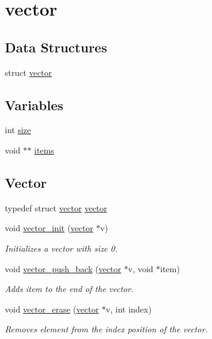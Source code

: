 \hypertarget{group__vector}{}\section{vector}
\label{group__vector}
\subsection*{Data Structures}
\begin{DoxyCompactItemize}
\item 
struct \hyperlink{structvector}{vector}
\end{DoxyCompactItemize}
\subsection*{Variables}
\begin{DoxyCompactItemize}
\item 
int \hyperlink{group__vector_ga439227feff9d7f55384e8780cfc2eb82}{size}
\item 
void $\ast$$\ast$ \hyperlink{group__vector_ga94977134c19c2c536550e6b13d69218d}{items}
\end{DoxyCompactItemize}
\subsection*{Vector}
\begin{DoxyCompactItemize}
\item 
typedef struct \hyperlink{structvector}{vector} \hyperlink{group__vector_ga604ea30e5e116f443a85a821a53402c7}{vector}
\item 
void \hyperlink{group__vector_ga2ca876aefcda7c65704d5a5b4e334eea}{vector\+\_\+init} (\hyperlink{structvector}{vector} $\ast$v)
\begin{DoxyCompactList}\small\item\em Initializes a vector with size 0. \end{DoxyCompactList}\item 
void \hyperlink{group__vector_ga085e5c2ac696df22b2b2ae8326d03a84}{vector\+\_\+push\+\_\+back} (\hyperlink{structvector}{vector} $\ast$v, void $\ast$item)
\begin{DoxyCompactList}\small\item\em Adds item to the end of the vector. \end{DoxyCompactList}\item 
void \hyperlink{group__vector_ga951a0ef34f7e54967c45c59f9ded305b}{vector\+\_\+erase} (\hyperlink{structvector}{vector} $\ast$v, int index)
\begin{DoxyCompactList}\small\item\em Removes element from the index position of the vector. \end{DoxyCompactList}\end{DoxyCompactItemize}


